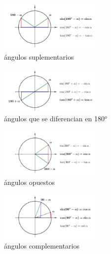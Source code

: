 \begin{multicols}{2}
\begin{figure}[H]
	\centering
	\includegraphics[width=0.45\textwidth]{img-rt/rt11.png}
	\caption*{\scriptsize{ángulos suplementarios}}
\end{figure}

\begin{figure}[H]
	\centering
	\includegraphics[width=0.45\textwidth]{img-rt/rt12.png}
	\caption*{\scriptsize{ángulos que se diferencian en 180$^o$}}
\end{figure}
\end{multicols}

\begin{multicols}{2}
\begin{figure}[H]
	\centering
	\includegraphics[width=0.45\textwidth]{img-rt/rt13.png}
	\caption*{\scriptsize{ángulos opuestos}}
\end{figure}

\begin{figure}[H]
	\centering
	\includegraphics[width=0.45\textwidth]{img-rt/rt14.png}
	\caption*{\scriptsize{ángulos complementarios}}
\end{figure}
\end{multicols}

